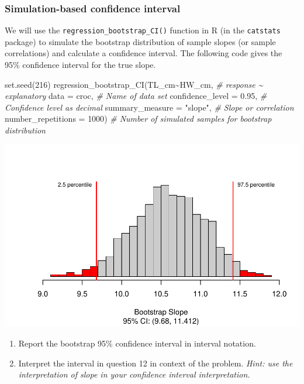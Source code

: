 \documentclass[
]{report}
\newenvironment{Shaded}{\begin{snugshade}}{\end{snugshade}}
\newcommand{\AttributeTok}[1]{\textcolor[rgb]{0.77,0.63,0.00}{#1}}
\newcommand{\CommentTok}[1]{\textcolor[rgb]{0.56,0.35,0.01}{\textit{#1}}}
\newcommand{\DecValTok}[1]{\textcolor[rgb]{0.00,0.00,0.81}{#1}}
\newcommand{\FloatTok}[1]{\textcolor[rgb]{0.00,0.00,0.81}{#1}}
\newcommand{\FunctionTok}[1]{\textcolor[rgb]{0.00,0.00,0.00}{#1}}
\newcommand{\NormalTok}[1]{#1}
\newcommand{\SpecialCharTok}[1]{\textcolor[rgb]{0.00,0.00,0.00}{#1}}
\newcommand{\StringTok}[1]{\textcolor[rgb]{0.31,0.60,0.02}{#1}}
\begin{document}
\hypertarget{simulation-based-confidence-interval}{%
\subsubsection*{Simulation-based confidence interval}\label{simulation-based-confidence-interval}}

We will use the \texttt{regression\_bootstrap\_CI()} function in R (in the \texttt{catstats} package) to simulate the bootstrap distribution of sample slopes (or sample correlations) and calculate a confidence interval. The following code gives the 95\% confidence interval for the true slope.

\begin{Shaded}
\begin{Highlighting}[]
\FunctionTok{set.seed}\NormalTok{(}\DecValTok{216}\NormalTok{)}
\FunctionTok{regression\_bootstrap\_CI}\NormalTok{(TL\_cm}\SpecialCharTok{\textasciitilde{}}\NormalTok{HW\_cm, }\CommentTok{\# response \textasciitilde{} explanatory}
   \AttributeTok{data =}\NormalTok{ croc, }\CommentTok{\# Name of data set}
   \AttributeTok{confidence\_level =} \FloatTok{0.95}\NormalTok{, }\CommentTok{\# Confidence level as decimal}
   \AttributeTok{summary\_measure =} \StringTok{"slope"}\NormalTok{, }\CommentTok{\# Slope or correlation}
   \AttributeTok{number\_repetitions =} \DecValTok{1000}\NormalTok{) }\CommentTok{\# Number of simulated samples for bootstrap distribution}
\end{Highlighting}
\end{Shaded}

\begin{center}\includegraphics[width=0.7\linewidth]{13-OCA10-regression-simulation_files/figure-latex/unnamed-chunk-7-1} \end{center}

\begin{enumerate}
\def\labelenumi{\arabic{enumi}.}
\setcounter{enumi}{11}
\item
  Report the bootstrap 95\% confidence interval in interval notation.\\
  \vspace{0.5in}
\item
  Interpret the interval in question 12 in context of the problem. \emph{Hint: use the interpretation of slope in your confidence interval interpretation.}
\end{enumerate}
\end{document}
